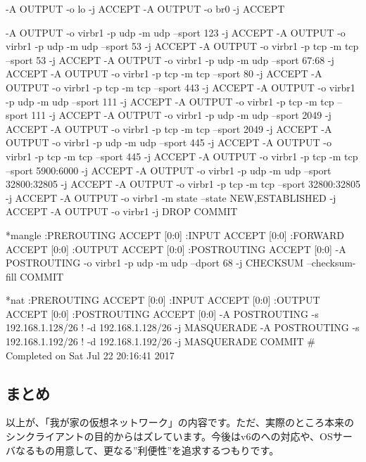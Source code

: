 \documentclass[mingoth,a4paper]{jsarticle}
\begin{document}
\begin{commandline}
-A OUTPUT -o lo -j ACCEPT
-A OUTPUT -o br0 -j ACCEPT

-A OUTPUT -o virbr1 -p udp -m udp --sport 123 -j ACCEPT
-A OUTPUT -o virbr1 -p udp -m udp --sport 53 -j ACCEPT
-A OUTPUT -o virbr1 -p tcp -m tcp --sport 53 -j ACCEPT
-A OUTPUT -o virbr1 -p udp -m udp --sport 67:68 -j ACCEPT
-A OUTPUT -o virbr1 -p tcp -m tcp --sport 80 -j ACCEPT
-A OUTPUT -o virbr1 -p tcp -m tcp --sport 443 -j ACCEPT
-A OUTPUT -o virbr1 -p udp -m udp --sport 111 -j ACCEPT
-A OUTPUT -o virbr1 -p tcp -m tcp --sport 111 -j ACCEPT
-A OUTPUT -o virbr1 -p udp -m udp --sport 2049 -j ACCEPT
-A OUTPUT -o virbr1 -p tcp -m tcp --sport 2049 -j ACCEPT
-A OUTPUT -o virbr1 -p udp -m udp --sport 445 -j ACCEPT
-A OUTPUT -o virbr1 -p tcp -m tcp --sport 445 -j ACCEPT
-A OUTPUT -o virbr1 -p tcp -m tcp --sport 5900:6000 -j ACCEPT
-A OUTPUT -o virbr1 -p udp -m udp --sport 32800:32805 -j ACCEPT
-A OUTPUT -o virbr1 -p tcp -m tcp --sport 32800:32805 -j ACCEPT
-A OUTPUT -o virbr1 -m state --state NEW,ESTABLISHED -j ACCEPT
-A OUTPUT -o virbr1 -j DROP
COMMIT

*mangle
:PREROUTING ACCEPT [0:0]
:INPUT ACCEPT [0:0]
:FORWARD ACCEPT [0:0]
:OUTPUT ACCEPT [0:0]
:POSTROUTING ACCEPT [0:0]
-A POSTROUTING -o virbr1 -p udp -m udp --dport 68 -j CHECKSUM --checksum-fill
COMMIT

*nat
:PREROUTING ACCEPT [0:0]
:INPUT ACCEPT [0:0]
:OUTPUT ACCEPT [0:0]
:POSTROUTING ACCEPT [0:0]
-A POSTROUTING -s 192.168.1.128/26 ! -d 192.168.1.128/26 -j MASQUERADE
-A POSTROUTING -s 192.168.1.192/26 ! -d 192.168.1.192/26 -j MASQUERADE
COMMIT
# Completed on Sat Jul 22 20:16:41 2017
\end{commandline}

\subsection{まとめ}
以上が、「我が家の仮想ネットワーク」の内容です。ただ、実際のところ本来のシンクライアントの目的からはズレています。今後はv6のへの対応や、OSサーバなるもの用意して、更なる”利便性”を追求するつもりです。
\clearpage

%

\mbox{}\newpage
\mbox{}\newpage

\printindex
\end{document}
